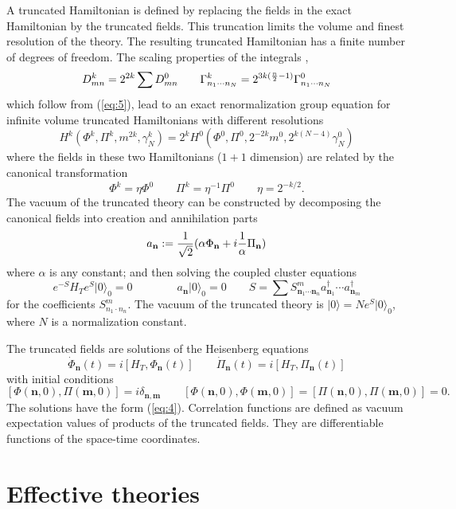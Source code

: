 \documentclass[aps,prc,reprint,showpacs,groupedaddress,onecolumn]{revtex4}
\begin{document}
A truncated Hamiltonian is defined by replacing the fields in the
exact Hamiltonian by the truncated fields.  This truncation limits the
volume and finest resolution of the theory.  The resulting truncated
Hamiltonian has a finite number of degrees of freedom.  
The scaling properties of the integrals \cite{fatih}, 
\[
D^k_{mn}  =
2^{2k} \sum D^0_{mn}  
\qquad 
\Gamma^k_{n_1 \cdots n_N} =
2^{3k({n\over 2}-1)} \Gamma^0_{n_1 \cdots n_N} 
\]
which follow from (\ref{eq:5}),
lead to an exact renormalization group equation for infinite volume 
truncated Hamiltonians with different resolutions
\[
H^k(\Phi^k, \Pi^k, m^{2k} ,\gamma_N^k) =
2^k H^0(\Phi^0, \Pi^0, 2^{-2k}m^{0} , 2^{k(N-4)}\gamma_N^0) 
\]
where the fields in these two Hamiltonians ($1+1$ dimension) are related by the 
canonical transformation
\[
\Phi^k = \eta \Phi^0 \qquad \Pi^k = \eta^{-1} \Pi^0 \qquad \eta= 2^{-k/2}.  
\]
The vacuum of the truncated theory can be constructed by 
decomposing the canonical fields into creation and annihilation 
parts
\[
a_{\mathbf{n}} := {1 \over \sqrt{2}}(\alpha \Phi_{\mathbf{n}} + 
i {1 \over \alpha} \Pi_{\mathbf{n}})  
\] 
where $\alpha$ is any constant; and then solving the coupled
cluster equations \cite{coester}
\[
e^{-S} H_T e^{S} \vert 0 \rangle_0 =0  \qquad 
\qquad a_{\mathbf{n}} \vert 0 \rangle_0 =0 \qquad 
S= \sum S^m_{\mathbf{n}_1 \cdots \mathbf{n}_n} a^{\dagger}_{\mathbf{n}_1}
\cdots a^{\dagger}_{\mathbf{n}_m}  
\]
for the coefficients $S^m_{n_1 \cdot n_n}$. The vacuum of 
the truncated theory is 
$\vert 0 \rangle  = N e^{S} \vert 0 \rangle_0 $,
where $N$ is a normalization constant.

The truncated fields are solutions of 
the Heisenberg equations
\[
\dot{\Phi}_{\mathbf{n}}(t) = i [H_T, {\Phi}_{\mathbf{n}}(t)]  
\qquad
\dot{\Pi}_{\mathbf{n}}(t) = i [H_T, {\Pi}_{\mathbf{n}}(t)]   
\]
with initial conditions
\[
[\Phi (\mathbf{n},0), \Pi (\mathbf{m},0)]=
i \delta_{\mathbf{n},\mathbf{m}}
\qquad
[\Phi (\mathbf{n},0), \Phi (\mathbf{m},0)]=
[\Pi (\mathbf{n},0), \Pi (\mathbf{m},0)]=0 . 
\]
The solutions have the form (\ref{eq:4}).
Correlation functions are defined as vacuum expectation values of 
products of the truncated fields.  They are differentiable functions of 
the space-time coordinates.

\section{Effective theories}
\end{document}

